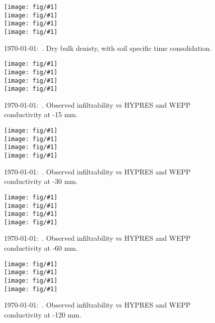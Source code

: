 \documentclass[a4paper]{article}
\newcommand{\figright}[1]{\texttt{[image: fig/\#1]}}
\newcommand{\figctop}[1]{\hspace*{-1cm}\figright{#1}}
\newcommand{\figc}[1]{\vspace*{-1.6cm}\figctop{#1}}
\newcommand{\MyID}{\today:~}
\begin{document}
\pagestyle{empty}

\begin{figure}[htbp]
  \begin{center}
    \figctop{rho_b_L1} \\
    \figc{rho_b_L2} \\
    \figc{rho_b_L3} \\
    \figc{rho_b_L4}
  \end{center}
  \caption{\MyID{}. Dry bulk denisty, with soil specific time consolidation.}
  \label{fig:rho_b}
\end{figure}

\begin{figure}[htbp]
  \begin{center}
    \figctop{K15_L1} \\
    \figc{K15_L2} \\
    \figc{K15_L3} \\
    \figc{K15_L4}
  \end{center}
  \caption{\MyID{}. Observed infiltrability vs HYPRES and WEPP conductivity at -15 mm.}
  \label{fig:K15}
\end{figure}

\begin{figure}[htbp]
  \begin{center}
    \figctop{K30_L1} \\
    \figc{K30_L2} \\
    \figc{K30_L3} \\
    \figc{K30_L4}
  \end{center}
  \caption{\MyID{}. Observed infiltrability vs HYPRES and WEPP conductivity at -30 mm.}
  \label{fig:K30}
\end{figure}

\begin{figure}[htbp]
  \begin{center}
    \figctop{K60_L1} \\
    \figc{K60_L2} \\
    \figc{K60_L3} \\
    \figc{K60_L4}
  \end{center}
  \caption{\MyID{}. Observed infiltrability vs HYPRES and WEPP conductivity at -60 mm.}
  \label{fig:K60}
\end{figure}

\begin{figure}[htbp]
  \begin{center}
    \figctop{K120_L1} \\
    \figc{K120_L2} \\
    \figc{K120_L3} \\
    \figc{K120_L4}
  \end{center}
  \caption{\MyID{}. Observed infiltrability vs HYPRES and WEPP conductivity at -120 mm.}
  \label{fig:K120}
\end{figure}
\end{document}
